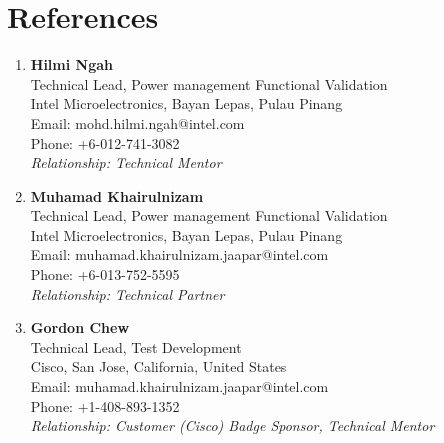 \section{\textbf{References}}
\vspace{-0.2mm}
\small{
\begin{enumerate}[leftmargin=*,labelsep=2mm]


\item \textbf{Hilmi Ngah}\\
   Technical Lead, Power management Functional Validation\\
   Intel Microelectronics, Bayan Lepas, Pulau Pinang\\
   Email: mohd.hilmi.ngah@intel.com\\
   Phone: +6-012-741-3082\\
   \textit{Relationship: Technical Mentor}
     
\item \textbf{Muhamad Khairulnizam}\\
   Technical Lead, Power management Functional Validation\\
   Intel Microelectronics, Bayan Lepas, Pulau Pinang\\
   Email: muhamad.khairulnizam.jaapar@intel.com\\
   Phone: +6-013-752-5595\\
   \textit{Relationship: Technical Partner}


\item \textbf{Gordon Chew}\\
   Technical Lead, Test Development\\
   Cisco, San Jose, California, United States \\
   Email: muhamad.khairulnizam.jaapar@intel.com\\
   Phone: +1-408-893-1352\\
   \textit{Relationship: Customer (Cisco) Badge Sponsor, Technical Mentor}

\end{enumerate}
}